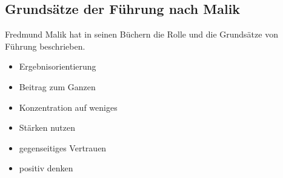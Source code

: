 \subsection{Grundsätze der Führung nach Malik}
\label{fuehrung-grundsaetze}


Fredmund Malik \cite{malik-fuehrung} hat in seinen Büchern die Rolle und die Grundsätze von Führung beschrieben.

\begin{itemize}
    \item Ergebnisorientierung
    \item Beitrag zum Ganzen
    \item Konzentration auf weniges
    \item Stärken nutzen
    \item gegenseitiges Vertrauen
    \item positiv denken
\end{itemize}
